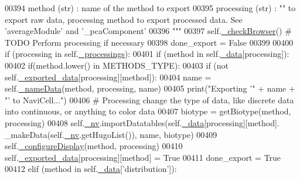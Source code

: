 \begin{DoxyCode}
00394 \textcolor{stringliteral}{            method (str) : name of the method to export}
00395 \textcolor{stringliteral}{            processing (str) : "" to export raw data, processing method to export
       processed data. See 'averageModule' and '\_pcaComponent'}
00396 \textcolor{stringliteral}{        """}
00397         self.\hyperlink{classnavicom_1_1navicom_1_1NaviCom_ab468a31a5f439bcae23f4c75b8c67f65}{_checkBrowser}() \textcolor{comment}{# TODO Perform processing if necessary}
00398         done\_export = \textcolor{keyword}{False}
00399 
00400         \textcolor{keywordflow}{if} (processing \textcolor{keywordflow}{in} self.\hyperlink{classnavicom_1_1navicom_1_1NaviCom_ac6a14d6a91cd2f236eef71496a6f249c}{_processings}):
00401             \textcolor{keywordflow}{if} (method \textcolor{keywordflow}{in} self.\hyperlink{classnavicom_1_1navicom_1_1NaviCom_a407b2b5c30a5652ee85c4be54b3e6679}{_data}[processing]):
00402                 \textcolor{keywordflow}{if}(method.lower() \textcolor{keywordflow}{in} METHODS\_TYPE):
00403                     \textcolor{keywordflow}{if} (\textcolor{keywordflow}{not} self.\hyperlink{classnavicom_1_1navicom_1_1NaviCom_ab7328fbbe89a1b3cb2db8c3d456d958f}{_exported_data}[processing][method]):
00404                         name = self.\hyperlink{classnavicom_1_1navicom_1_1NaviCom_a140128d0fd12930347cc2375c154072d}{_nameData}(method, processing, name)
00405                         \textcolor{keywordflow}{print}(\textcolor{stringliteral}{"Exporting '"} + name + \textcolor{stringliteral}{"' to NaviCell..."})
00406                         \textcolor{comment}{# Processing change the type of data, like discrete data 
      into continuous, or anything to color data}
00407                         biotype = getBiotype(method, processing)
00408                         self.\hyperlink{classnavicom_1_1navicom_1_1NaviCom_afff3fd56fa16a68bab52ba8d801e325a}{_nv}.importDatatables(self.\hyperlink{classnavicom_1_1navicom_1_1NaviCom_a407b2b5c30a5652ee85c4be54b3e6679}{_data}[processing][method].
      \_makeData(self.\hyperlink{classnavicom_1_1navicom_1_1NaviCom_afff3fd56fa16a68bab52ba8d801e325a}{_nv}.getHugoList()), name, biotype)
00409                         self.\hyperlink{classnavicom_1_1navicom_1_1NaviCom_a5bde750c01abc8e64338fb148c59b435}{_configureDisplay}(method, processing)
00410                         self.\hyperlink{classnavicom_1_1navicom_1_1NaviCom_ab7328fbbe89a1b3cb2db8c3d456d958f}{_exported_data}[processing][method] = \textcolor{keyword}{True}
00411                         done\_export = \textcolor{keyword}{True}
00412                 \textcolor{keywordflow}{elif} (method \textcolor{keywordflow}{in} self.\hyperlink{classnavicom_1_1navicom_1_1NaviCom_a407b2b5c30a5652ee85c4be54b3e6679}{_data}[\textcolor{stringliteral}{'distribution'}]):

\end{DoxyCode}
